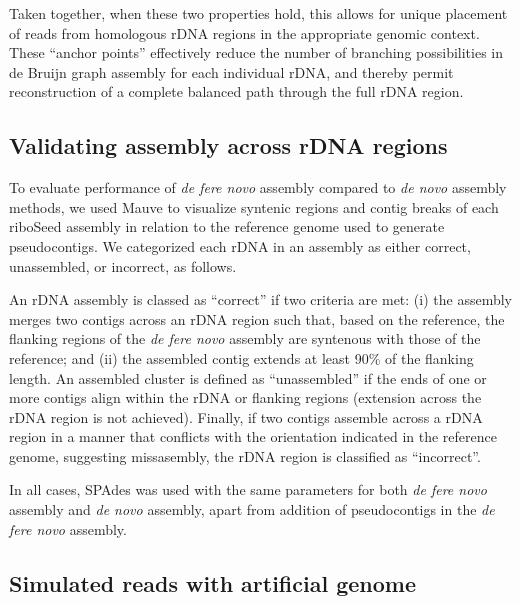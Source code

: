 \documentclass[a4,center,fleqn]{NAR}
\begin{document}
Taken together, when these two properties hold, this allows for unique placement of reads from homologous rDNA regions in the appropriate genomic context. These ``anchor points'' effectively reduce the number of branching possibilities in de Bruijn graph assembly for each individual rDNA, and thereby permit reconstruction of a complete balanced path through the full rDNA region.

\subsection*{Validating assembly across rDNA regions}

To evaluate performance of \textit{de fere novo} assembly compared to \textit{de novo} assembly methods, we used Mauve to visualize syntenic regions and contig breaks of each riboSeed assembly in relation to the reference genome used to generate pseudocontigs. We categorized each rDNA in an assembly as either correct, unassembled, or incorrect, as follows.

An rDNA assembly is classed as ``correct'' if two criteria are met: (i) the assembly merges two contigs across an rDNA region such that, based on the reference, the flanking regions of the \textit{de fere novo} assembly are syntenous with those of the reference; and (ii) the assembled contig extends at least 90\% of the flanking length. An assembled cluster is defined as ``unassembled'' if the ends of one or more contigs align within the rDNA or flanking regions (extension across the rDNA region is not achieved). Finally, if two contigs assemble across a rDNA region in a manner that conflicts with the orientation indicated in the reference genome, suggesting missasembly, the rDNA region is classified as ``incorrect''.

In all cases, SPAdes was used with the same parameters for both \textit{de fere novo} assembly and \textit{de novo} assembly, apart from addition of pseudocontigs in the \textit{de fere novo} assembly.

\subsection*{Simulated reads with artificial genome}
\end{document}
